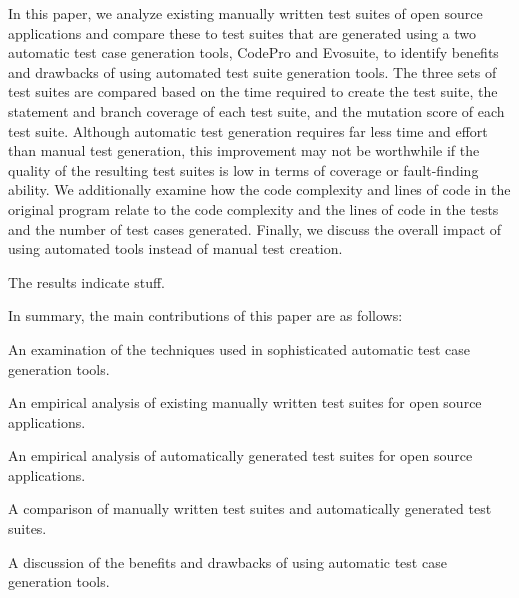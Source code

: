 In this paper, we analyze existing manually written test suites of open source applications and compare these to test suites that are generated using a two automatic test case generation tools, CodePro and Evosuite, to identify benefits and drawbacks of using automated test suite generation tools.  The three sets of test suites are compared based on the time required to create the test suite, the statement and branch coverage of each test suite, and the mutation score of each test suite.  Although automatic test generation requires far less time and effort than manual test generation, this improvement may not be worthwhile if the quality of the resulting test suites is low in terms of coverage or fault-finding ability.  We additionally examine how the code complexity and lines of code in the original program relate to the code complexity and the lines of code in the tests and the number of test cases generated. Finally, we discuss the overall impact of using automated tools instead of manual test creation.

The results indicate stuff.

In summary, the main contributions of this paper are as follows:
\squishlist 
\item An examination of the techniques used in sophisticated automatic test case generation tools.
\item An empirical analysis of existing manually written test suites for open source applications.
\item An empirical analysis of automatically generated test suites for open source applications.
\item A comparison of manually written test suites and automatically generated test suites.
\item A discussion of the benefits and drawbacks of using automatic test case generation tools.
\squishend 

